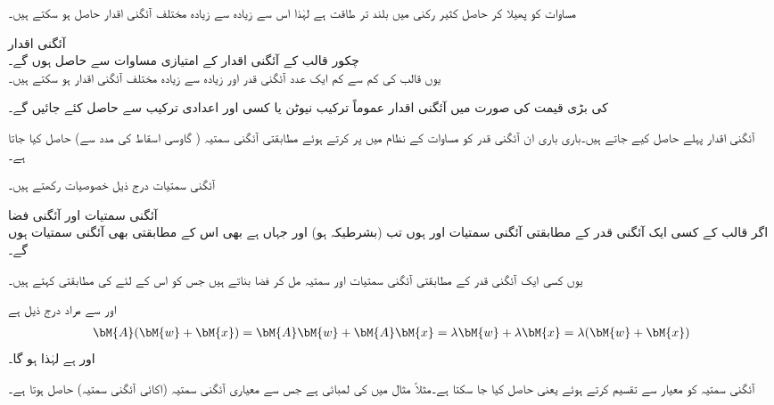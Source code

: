 مساوات  کو پھیلا کر حاصل کثیر رکنی میں  بلند تر طاقت ہے لہٰذا اس سے زیادہ سے زیادہ  مختلف آئگنی اقدار حاصل ہو سکتے ہیں۔ 

\quad آئگنی اقدار\\
چکور قالب  کے آئگنی اقدار  کے امتیازی مساوات  سے حاصل ہوں گے۔\\
یوں  قالب کی کم سے کم ایک عدد آئگنی قدر اور زیادہ سے زیادہ  مختلف  آئگنی اقدار ہو سکتے ہیں۔

 کی بڑی قیمت کی صورت میں آئگنی اقدار عموماً ترکیب نیوٹن یا کسی اور اعدادی ترکیب سے حاصل کئے جائیں گے۔

آئگنی اقدار پہلے حاصل کیے جاتے ہیں۔باری باری ان آئگنی قدر کو مساوات  کے نظام میں پر کرتے ہوئے مطابقتی آئگنی سمتیہ ( گاوسی اسقاط کی مدد سے) حاصل کیا جاتا ہے۔

آئگنی سمتیات درج ذیل خصوصیات رکھتے ہیں۔

\quad آئگنی سمتیات اور آئگنی فضا\\
اگر قالب  کے کسی ایک آئگنی قدر  کے مطابقتی آئگنی سمتیات  اور  ہوں تب  (بشرطیکہ  ہو) اور  جہاں  ہے بھی اس  کے مطابقتی بھی آئگنی سمتیات ہوں گے۔

یوں کسی ایک آئگنی قدر کے مطابقتی آئگنی سمتیات اور  سمتیہ مل کر فضا بناتے ہیں جس کو اس  کے لئے  کی مطابقتی   کہتے ہیں۔

 اور  سے مراد درج ذیل ہے
\begin{align*}
\bM{A}(\bM{w}+\bM{x})=\bM{A}\bM{w}+\bM{A}\bM{x}=\lambda \bM{w}+\lambda\bM{x}=\lambda(\bM{w}+\bM{x})
\end{align*}
اور  ہے لہٰذا  ہو گا۔

آئگنی سمتیہ کو معیار سے تقسیم کرتے ہوئے   یعنی  حاصل کیا جا سکتا ہے۔مثلاً مثال  میں  کی لمبائی  ہے جس سے معیاری آئگنی سمتیہ (اکائی آئگنی سمتیہ)  حاصل ہوتا ہے۔ 

